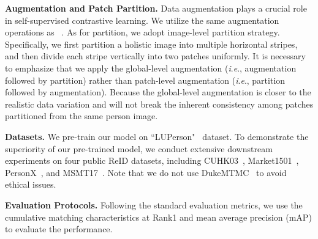 \documentclass[10pt,twocolumn,letterpaper]{article}
\newcommand{\ieno}{\textit{i}.\textit{e}.}
\begin{document}
\noindent\textbf{Augmentation and Patch Partition.} 
Data augmentation plays a crucial role in self-supervised contrastive learning. We utilize the same augmentation operations as ~\cite{fu2021unsupervised}.
As for partition, we adopt image-level partition strategy. Specifically, we first partition a holistic image into multiple horizontal stripes, and then divide each stripe vertically into two patches uniformly.
It is necessary to emphasize that we apply the global-level augmentation (\ieno, augmentation followed by partition) rather than patch-level augmentation (\ieno, partition followed by augmentation). Because the global-level augmentation is closer to the realistic data variation and will not break the inherent consistency among patches partitioned from the same person image. 

\noindent\textbf{Datasets.} 
We pre-train our model on ``LUPerson"~\cite{fu2021unsupervised} dataset. To demonstrate the superiority of our pre-trained model, we conduct extensive downstream experiments on four public ReID datasets, including CUHK03~\cite{li2014deepreid}, Market1501~\cite{zheng2015scalable}, PersonX~\cite{sun2019dissecting}, and MSMT17~\cite{wei2018person}. Note that we do not use DukeMTMC~\cite{zheng2017unlabeled} to avoid ethical issues.

\noindent\textbf{Evaluation Protocols.} 
Following the standard evaluation metrics, we use the cumulative matching characteristics at Rank1 and mean average precision (mAP) to evaluate the performance.
\end{document}

